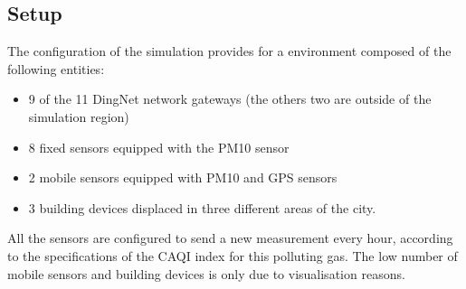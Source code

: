 \subsection{Setup}
The configuration of the simulation provides for a environment composed of the following entities:
\begin{itemize}
    \item 9 of the 11 DingNet network gateways (the others two are outside of the simulation region)
    \item 8 fixed sensors equipped with the PM10 sensor
    \item 2 mobile sensors equipped with PM10 and GPS sensors
    \item 3 building devices displaced in three different areas of the city.
\end{itemize}
All the sensors are configured to send a new measurement every hour, according to the specifications of the CAQI index for this polluting gas.
The low number of mobile sensors and building devices is only due to visualisation reasons. 

